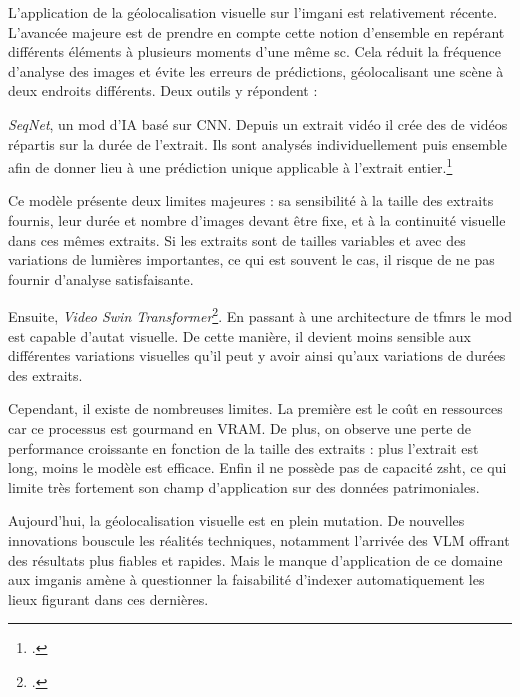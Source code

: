 L'application de la géolocalisation visuelle sur l'\gls{imgani} est relativement récente. L'avancée majeure est de prendre en compte cette notion d'ensemble  en repérant différents éléments à plusieurs moments d'une même \gls{sc}. Cela réduit la fréquence d'analyse des images et évite les erreurs de prédictions, géolocalisant une scène à deux endroits différents. Deux outils y répondent :\newline

\textit{SeqNet}, un \gls{mod} d'\gls{IA} basé sur \gls{CNN}. Depuis un extrait vidéo il crée des  de vidéos répartis sur la durée de l'extrait. Ils sont analysés individuellement puis ensemble afin de donner lieu à une prédiction unique applicable à l'extrait entier.\footcite{gargSeqNetLearningDescriptors2021} 

Ce modèle présente deux limites majeures : sa sensibilité à la taille des extraits fournis, leur durée et nombre d'images devant être fixe, et à la continuité visuelle dans ces mêmes extraits. Si les extraits sont de tailles variables et avec des variations de lumières importantes, ce qui est souvent le cas, il risque de ne pas fournir d'analyse satisfaisante.\newline

Ensuite, \textit{Video Swin Transformer}\footcite{liuVideoSwinTransformer2021}. En passant à une architecture de \gls{tfmrs} le \gls{mod} est capable d'\gls{autat} visuelle. De cette manière, il devient moins sensible aux différentes variations visuelles qu'il peut y avoir ainsi qu'aux variations de durées des extraits. 

Cependant, il existe de nombreuses limites. La première est le coût en ressources car ce processus est gourmand en \gls{VRAM}. De plus, on observe une perte de performance croissante en fonction de la taille des extraits : plus l'extrait est long, moins le modèle est efficace. Enfin il ne possède pas de capacité \gls{zsht}, ce qui limite très fortement son champ d'application sur des données patrimoniales.\newline

Aujourd'hui, la géolocalisation visuelle est en plein mutation. De nouvelles innovations bouscule les réalités techniques, notamment l'arrivée des \gls{VLM} offrant des résultats plus fiables et rapides. Mais le manque d'application de ce domaine aux \glspl{imgani} amène à questionner la faisabilité d'indexer automatiquement les lieux figurant dans ces dernières.\newline

